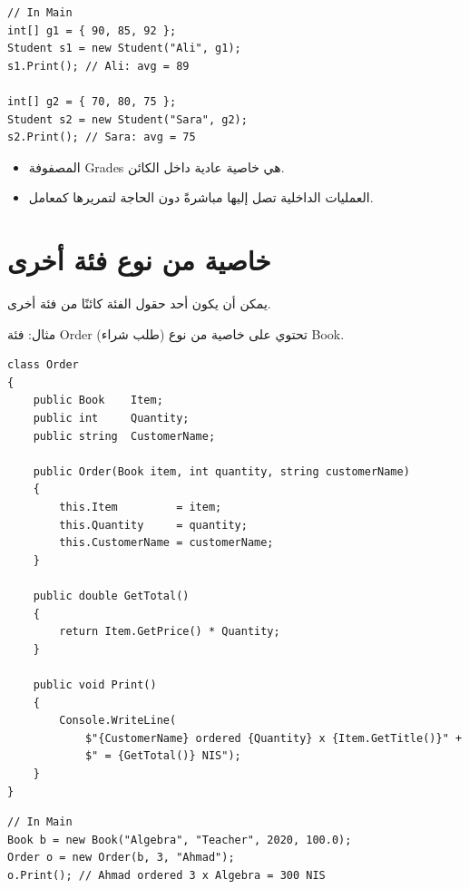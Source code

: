 \documentclass[14pt]{extarticle}
\begin{document}
\begin{boxExample}
\begin{english}
\begin{verbatim}
// In Main
int[] g1 = { 90, 85, 92 };
Student s1 = new Student("Ali", g1);
s1.Print(); // Ali: avg = 89

int[] g2 = { 70, 80, 75 };
Student s2 = new Student("Sara", g2);
s2.Print(); // Sara: avg = 75
\end{verbatim}
\end{english}
\end{boxExample}

\begin{itemize}[itemsep=1pt]
    \item المصفوفة \textenglish{Grades} هي خاصية عادية داخل الكائن.
    \item العمليات الداخلية تصل إليها مباشرةً دون الحاجة لتمريرها كمعامل.
\end{itemize}

\clearpage
\section{خاصية من نوع فئة أخرى}

يمكن أن يكون أحد حقول الفئة كائنًا من فئة أخرى.

\begin{boxNote}
مثال: فئة \textenglish{Order} (طلب شراء) تحتوي على خاصية من نوع \textenglish{Book}.
\end{boxNote}

{\small
\begin{boxExample}
\begin{english}
\begin{verbatim}
class Order
{
    public Book    Item;
    public int     Quantity;
    public string  CustomerName;

    public Order(Book item, int quantity, string customerName)
    {
        this.Item         = item;
        this.Quantity     = quantity;
        this.CustomerName = customerName;
    }

    public double GetTotal()
    {
        return Item.GetPrice() * Quantity;
    }

    public void Print()
    {
        Console.WriteLine(
            $"{CustomerName} ordered {Quantity} x {Item.GetTitle()}" +
            $" = {GetTotal()} NIS");
    }
}
\end{verbatim}
\end{english}
\end{boxExample}


\begin{boxExample}
\begin{english}
\begin{verbatim}
// In Main
Book b = new Book("Algebra", "Teacher", 2020, 100.0);
Order o = new Order(b, 3, "Ahmad");
o.Print(); // Ahmad ordered 3 x Algebra = 300 NIS
\end{verbatim}
\end{english}
\end{boxExample}
}
\end{document}
